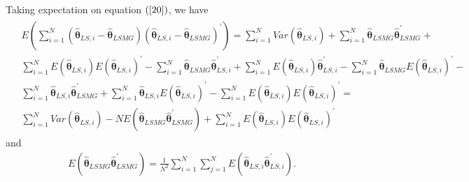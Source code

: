 \documentclass[12pt,a4paper,hyperref]{article}
\begin{document}
Taking expectation on equation $(\ref{20})$, we have
\begin{align}
\begin{split}
&E\left( \sum^{N}_{i=1}\left( \hat{\boldsymbol{\theta}}_{LS,i}- \hat{\boldsymbol{\theta}}_{LSMG}\right)\left( \hat{\boldsymbol{\theta}}_{LS,i}- \hat{\boldsymbol{\theta}}_{LSMG}\right)^{'} \right)=
 \sum^{N}_{i=1}Var\left(\hat{\boldsymbol{\theta}}_{LS,i}\right)+
\sum^{N}_{i=1}\hat{\boldsymbol{\theta}}_{LSMG}\hat{\boldsymbol{\theta}}^{'}_{LSMG}+  \\
&\sum^{N}_{i=1}E\left(\hat{\boldsymbol{\theta}}_{LS,i}\right) E\left(\hat{\boldsymbol{\theta}}_{LS,i}\right)^{'}-
\sum^{N}_{i=1}\hat{\boldsymbol{\theta}}_{LSMG}\hat{\boldsymbol{\theta}}^{'}_{LS,i}+
\sum^{N}_{i=1}E\left(\hat{\boldsymbol{\theta}}_{LS,i}\right)\hat{\boldsymbol{\theta}}^{'}_{LS,i}-
\sum^{N}_{i=1}\hat{\boldsymbol{\theta}}_{LSMG}E\left(\hat{\boldsymbol{\theta}}_{LS,i}\right)^{'}- \\
&\sum^{N}_{i=1}\hat{\boldsymbol{\theta}}_{LS,i}\hat{\boldsymbol{\theta}}^{'}_{LSMG}+
\sum^{N}_{i=1}\hat{\boldsymbol{\theta}}_{LS,i}E\left(\hat{\boldsymbol{\theta}}_{LS,i}\right)^{'}-
\sum^{N}_{i=1}E\left(\hat{\boldsymbol{\theta}}_{LS,i}\right) E\left(\hat{\boldsymbol{\theta}}_{LS,i}\right)^{'} = \\
&\sum^{N}_{i=1}Var\left(\hat{\boldsymbol{\theta}}_{LS,i}\right)-N E \left(\hat{\boldsymbol{\theta}}_{LSMG}\hat{\boldsymbol{\theta}}^{'}_{LSMG} \right)+\sum^{N}_{i=1}E\left(\hat{\boldsymbol{\theta}}_{LS,i}\right) E\left(\hat{\boldsymbol{\theta}}_{LS,i}\right)^{'}
\end{split}
\end{align}
and
\begin{align}
E \left(\hat{\boldsymbol{\theta}}_{LSMG}\hat{\boldsymbol{\theta}}^{'}_{LSMG} \right)=\frac{1}{N^{2}} \sum^{N}_{i=1}\sum^{N}_{j=1}E \left(\hat{\boldsymbol{\theta}}_{LS,i}\hat{\boldsymbol{\theta}}^{'}_{LS,i} \right).
\end{align}
\end{document}

